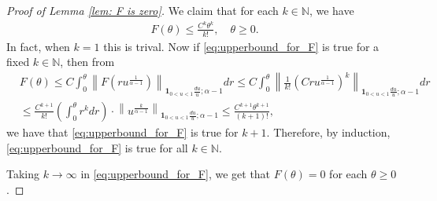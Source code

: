 \documentclass[12pt,a4paper]{amsart}
\theoremstyle{definition}
\numberwithin{equation}{section}
\begin{document}
\begin{proof}
  [Proof of Lemma \ref{lem: F is zero}]
  We claim that for each $k \in \mathbb N$, we have
  \begin{align}
    \label{eq:upperbound_for_F}
    F(\theta) \leq \frac{C^k \theta^k}{k!},
    \quad \theta \geq 0.
  \end{align}
  In fact, when $k = 1$ this is trival. Now if \eqref{eq:upperbound_for_F} is true for a fixed $k \in \mathbb N$, then from
  \begin{align}
    &F(\theta)
      \leq C \int_0^\theta \left\|  F\left(ru^{ \frac{1}{\alpha - 1}  }\right)\right\|_{\mathbf 1_{0<u<1}\frac{du}{u}; \alpha - 1} dr
      \leq C \int_0^\theta \left\|  \frac{1}{k!}\left(Cru^{ \frac{1}{\alpha - 1}  } \right)^k \right\|_{\mathbf 1_{0<u<1}\frac{du}{u}; \alpha - 1} dr
    \\ &\leq \frac{C^{k+1}}{k!} \left(\int_0^\theta r^k dr\right) \cdot \left\|u^{\frac{k}{\alpha - 1}} \right\|_{\mathbf 1_{0<u<1}\frac{du}{u}; \alpha - 1} \leq \frac{C^{k+1} \theta^{k+1}}{(k+1)!},
  \end{align}
  we have that \eqref{eq:upperbound_for_F} is true for $k+1$. 
  Therefore, by induction, \eqref{eq:upperbound_for_F} is true for all $k \in \mathbb N$.

  Taking $k \to \infty$ in \eqref{eq:upperbound_for_F}, we get that $F(\theta) = 0$ for each $\theta \geq 0$.
\end{proof}
\end{document}
